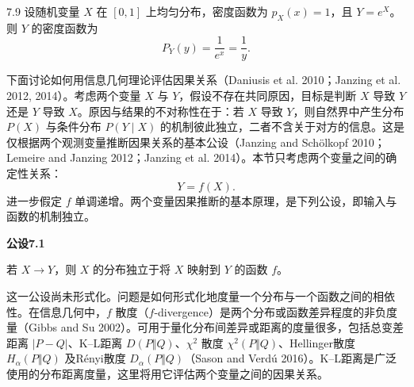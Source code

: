 \begin{bookexample}{7.9}
设随机变量 $X$ 在 $[0,1]$ 上均匀分布，密度函数为 $p_X(x)=1$，且 $Y=e^X$。则 $Y$ 的密度函数为
\[
P_Y(y)=\frac1{e^x}=\frac1y.
\]
\end{bookexample}

下面讨论如何用信息几何理论评估因果关系（Daniusis et al. 2010；Janzing et al. 2012, 2014）。考虑两个变量 $X$ 与 $Y$，假设不存在共同原因，目标是判断 $X$ 导致 $Y$ 还是 $Y$ 导致 $X$。原因与结果的不对称性在于：若 $X$ 导致 $Y$，则自然界中产生分布 $P(X)$ 与条件分布 $P(Y\mid X)$ 的机制彼此独立，二者不含关于对方的信息。这是仅根据两个观测变量推断因果关系的基本公设（Janzing and Schölkopf 2010；Lemeire and Janzing 2012；Janzing et al. 2014）。本节只考虑两个变量之间的确定性关系：
\begin{equation}
Y=f(X).
\tag{7.33}
\end{equation}
进一步假定 $f$ 单调递增。两个变量因果推断的基本原理，是下列公设，即输入与函数的机制独立。

\par\medskip{}\noindent\textbf{公设7.1}\par
若 $X\to Y$，则 $X$ 的分布独立于将 $X$ 映射到 $Y$ 的函数 $f$。

这一公设尚未形式化。问题是如何形式化地度量一个分布与一个函数之间的相依性。在信息几何中，$f$ 散度（$f$-divergence）是两个分布或函数差异程度的非负度量（Gibbs and Su 2002）。可用于量化分布间差异或距离的度量很多，包括总变差距离 $|P-Q|$、K–L距离 $D(P\Vert Q)$、$\chi^2$ 散度 $\chi^2(P\Vert Q)$、Hellinger散度 $H_\alpha(P\Vert Q)$ 及Rényi散度 $D_\alpha(P\Vert Q)$（Sason and Verdú 2016）。K–L距离是广泛使用的分布距离度量，这里将用它评估两个变量之间的因果关系。

